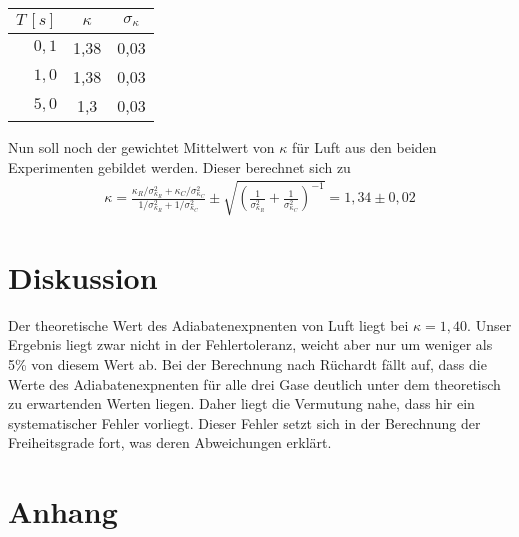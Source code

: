 \documentclass[12pt, a4paper, twoside]{scrartcl}
\begin{document}
\begin{table} [H]
\centering
\begin{tabular}{|r|c|c|} \hline
    $T\,[s]$ & $\kappa$ & $\sigma_\kappa$ \\ \hline
    $0,1$ & 1,38& 0,03 \\
    $1,0$ & 1,38& 0,03\\
    $5,0$ & 1,3& 0,03\\ \hline
 \end{tabular} 
 \caption{\label{tab:clement}}
\end{table}
Nun soll noch der gewichtet Mittelwert von $\kappa$ für Luft aus den beiden Experimenten gebildet werden. Dieser berechnet sich zu
\begin{align*}
\kappa=\frac{\kappa_R/\sigma_{\kappa_R}^2+\kappa_C/\sigma_{\kappa_C}^2}{1/\sigma_{\kappa_R}^2+1/\sigma_{\kappa_C}^2}\pm\sqrt{\left(\frac{1}{\sigma_{\kappa_R}^2}+\frac{1}{\sigma_{\kappa_C}^2}\right)^{-1}}=1,34\pm0,02
\end{align*}


\section{Diskussion}
\label{sec:diskussion}
Der theoretische Wert des Adiabatenexpnenten von Luft liegt bei $\kappa=1,40$. Unser Ergebnis liegt zwar nicht in der Fehlertoleranz, weicht aber nur um weniger als 5\% von diesem Wert ab. Bei der Berechnung nach Rüchardt fällt auf, dass die Werte des Adiabatenexpnenten für alle drei Gase deutlich unter dem theoretisch zu erwartenden Werten liegen. Daher liegt die Vermutung nahe, dass hir ein systematischer Fehler vorliegt. Dieser Fehler setzt sich in der Berechnung der Freiheitsgrade fort, was deren Abweichungen erklärt. 



\newpage
\section*{Anhang}
\end{document}

